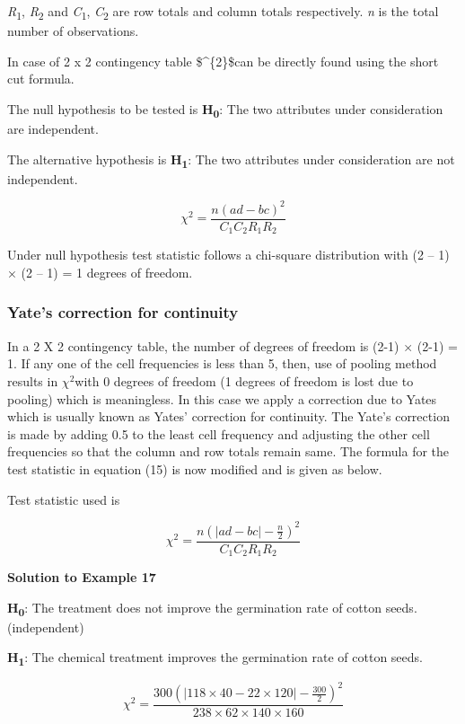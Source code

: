 \documentclass[
]{book}
\begin{document}
\emph{R}\textsubscript{1}, \emph{R}\textsubscript{2} and \emph{C}\textsubscript{1}, \emph{C}\textsubscript{2} are row totals and column totals respectively. \emph{n} is the total number of observations.

In case of 2 x 2 contingency table \$\chi\^{}\{2\}\$can be directly found using the short cut formula.

The null hypothesis to be tested is \textbf{H\textsubscript{0}}: The two attributes under consideration are independent.

The alternative hypothesis is \textbf{H\textsubscript{1}}: The two attributes under consideration are not independent.

\[\chi^{2} = \frac{n\left( ad - bc \right)^{2}}{C_{1}C_{2}R_{1}R_{2}}\]

Under null hypothesis test statistic follows a chi-square distribution with (2 -- 1) × (2 -- 1) = 1 degrees of freedom.

\hypertarget{yates-correction-for-continuity}{%
\subsubsection{Yate's correction for continuity}\label{yates-correction-for-continuity}}

In a 2 X 2 contingency table, the number of degrees of freedom is (2-1) × (2-1) = 1. If any one of the cell frequencies is less than 5, then, use of pooling method results in \(\chi^{2}\)with 0 degrees of freedom (1 degrees of freedom is lost due to pooling) which is meaningless. In this case we apply a correction due to Yates which is usually known as Yates' correction for continuity. The Yate's correction is made by adding 0.5 to the least cell frequency and adjusting the other cell frequencies so that the column and row totals remain same. The formula for the test statistic in equation (15) is now modified and is given as below.

Test statistic used is

\[\chi^{2} = \frac{{n\left( \left| ad - bc \right| - \frac{n}{2} \right)}^{2}}{C_{1}C_{2}R_{1}R_{2}}\]

\textbf{Solution to Example 17}

\textbf{H\textsubscript{0}}: The treatment does not improve the germination rate of cotton seeds. (independent)

\textbf{H\textsubscript{1}}: The chemical treatment improves the germination rate of cotton seeds.

\[\chi^{2} = \frac{{300\left( \left| 118 \times 40 - 22 \times 120 \right| - \frac{300}{2} \right)}^{2}}{238 \times 62 \times 140 \times 160}\]
\end{document}
